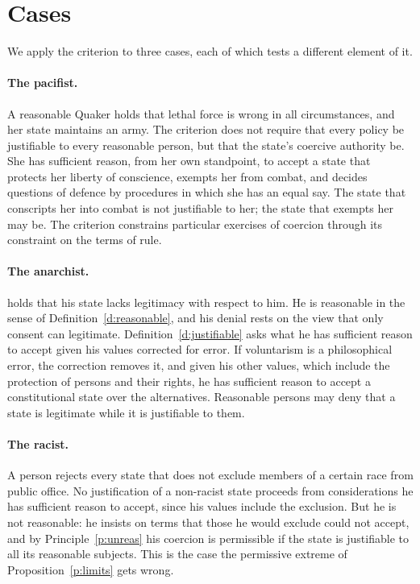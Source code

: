 \documentclass{situationist-preprint}
\begin{document}
\section{Cases}

We apply the criterion to three cases, each of which tests a different element of it.

\paragraph{The pacifist.} A reasonable Quaker holds that lethal force is wrong in all circumstances, and her state maintains an army. The criterion does not require that every policy be justifiable to every reasonable person, but that the state's coercive authority be. She has sufficient reason, from her own standpoint, to accept a state that protects her liberty of conscience, exempts her from combat, and decides questions of defence by procedures in which she has an equal say. The state that conscripts her into combat is not justifiable to her; the state that exempts her may be. The criterion constrains particular exercises of coercion through its constraint on the terms of rule.

\paragraph{The anarchist.} \citet{Simmons1979} holds that his state lacks legitimacy with respect to him. He is reasonable in the sense of Definition~\ref{d:reasonable}, and his denial rests on the view that only consent can legitimate. Definition~\ref{d:justifiable} asks what he has sufficient reason to accept given his values corrected for error. If voluntarism is a philosophical error, the correction removes it, and given his other values, which include the protection of persons and their rights, he has sufficient reason to accept a constitutional state over the alternatives. Reasonable persons may deny that a state is legitimate while it is justifiable to them.

\paragraph{The racist.} A person rejects every state that does not exclude members of a certain race from public office. No justification of a non-racist state proceeds from considerations he has sufficient reason to accept, since his values include the exclusion. But he is not reasonable: he insists on terms that those he would exclude could not accept, and by Principle~\ref{p:unreas} his coercion is permissible if the state is justifiable to all its reasonable subjects. This is the case the permissive extreme of Proposition~\ref{p:limits} gets wrong.
\end{document}
